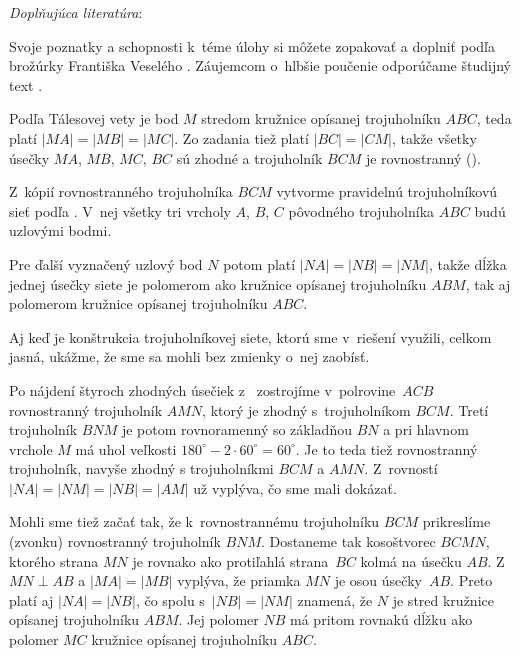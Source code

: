 {{\everypar{}
\smallskip
\emph{Doplňujúca literatúra}:

Svoje poznatky a schopnosti k~téme úlohy si môžete zopakovať a
doplniť podľa brožúrky Františka Veselého .
Záujemcom o~hlbšie poučenie odporúčame študijný text .

\smallskip
}

}

{%
Podľa Tálesovej vety je bod $M$ stredom kružnice
opísanej trojuholníku $ABC$, teda platí $|MA|=|MB|=|MC|$. Zo
zadania tiež platí $|BC|=|CM|$, takže všetky úsečky
$MA$, $MB$, $MC$, $BC$ sú zhodné a trojuholník $BCM$ je rovnostranný (\obr).
%

Z~kópií rovnostranného trojuholníka $BCM$ vytvorme pravidelnú trojuholníkovú
sieť podľa \obr{}. V~nej všetky tri vrcholy $A$, $B$, $C$
pôvodného trojuholníka $ABC$ budú uzlovými bodmi.
%

Pre ďalší vyznačený uzlový bod $N$ potom platí $|NA|=|NB|=|NM|$, takže
dĺžka jednej úsečky siete je polomerom ako kružnice opísanej
trojuholníku $ABM$, tak aj polomerom kružnice opísanej trojuholníku
$ABC$.


\poznamka
Aj keď je konštrukcia trojuholníkovej siete, ktorú sme
v~riešení využili, celkom jasná, ukážme, že sme sa mohli
bez zmienky o~nej zaobísť.

Po nájdení štyroch zhodných úsečiek z~ zostrojíme
v~polrovine~$ACB$ rovnostranný trojuholník $AMN$, ktorý je zhodný
s~trojuholníkom $BCM$. Tretí trojuholník $BNM$ je potom rovnoramenný
so základňou $BN$ a pri hlavnom vrchole $M$ má uhol
veľkosti $180^{\circ}-2\cdot60^{\circ}=60^{\circ}$.
Je to teda tiež rovnostranný trojuholník, navyše zhodný
s trojuholníkmi $BCM$ a $AMN$. Z~rovností $|NA|=|NM|=|NB|=|AM|$ už vyplýva,
čo sme mali dokázať.

Mohli sme tiež začať tak, že k~rovnostrannému trojuholníku $BCM$
prikreslíme (zvonku) rovnostranný trojuholník $BNM$.
Dostaneme tak kosoštvorec $BCMN$, ktorého strana $MN$ je rovnako
ako protiľahlá strana~$BC$ kolmá na úsečku $AB$.
Z~$MN\perp AB$ a $|MA|=|MB|$ vyplýva, že priamka $MN$ je
osou úsečky~$AB$. Preto platí aj $|NA|=|NB|$,
čo spolu s~$|NB|=|NM|$ znamená, že $N$ je stred
kružnice opísanej trojuholníku $ABM$. Jej polomer $NB$
má pritom rovnakú dĺžku ako polomer $MC$ kružnice opísanej trojuholníku $ABC$.

}
